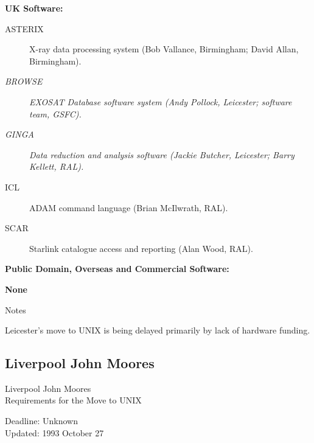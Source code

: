 \begin{center}
{\bf UK Software:}
\end{center}

\begin{description}
\item[ASTERIX] X-ray data processing system (Bob Vallance, Birmingham;
David Allan, Birmingham).
\item[{\em BROWSE}] {\em EXOSAT Database software system (Andy Pollock,
Leicester; software team, GSFC).}
\item[{\em GINGA}] {\em Data reduction and analysis software (Jackie
Butcher, Leicester; Barry Kellett, RAL).}
\item[ICL] ADAM command language (Brian McIlwrath, RAL).
\item[SCAR] Starlink catalogue access and reporting (Alan Wood, RAL).
\end{description}


\vspace{5mm}
\begin{center}
{\bf Public Domain, Overseas and Commercial Software:}
\end{center}

{\bf None}


\vspace{5mm}
\begin{center}
{\large\sc Notes}
\end{center}

Leicester's move to UNIX is being delayed primarily by lack of hardware
funding.


\newpage
\subsection{Liverpool John Moores}

\renewcommand{\starsitename}{Liverpool John Moores}
\renewcommand{\starnodename}{uk.ac.livjm.star}

\renewcommand{\starunixdate}{Unknown}
\renewcommand{\starupdate}{1993 October 27}

\renewcommand{\starsitetelephone}{051 231 2337}
\renewcommand{\starsitefax}{051 298 1014}

\begin{center}
{\Large\sc \starsitename \\ [2ex]
           Requirements for the Move to UNIX}

\vspace{3mm}
{\large\sc Deadline: \starunixdate \\ [1ex]
           Updated: \starupdate}
\end{center}

